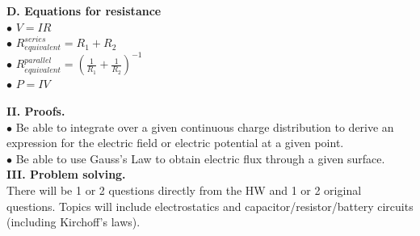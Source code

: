 \documentclass[11pt]{article}
\begin{document}
\begin{addmargin}[1em]{0em}
\textbf{D. Equations for resistance} \\
$\bullet$ $V = IR$ \\
$\bullet$ $R_{equivalent}^{series} = R_1 + R_2$ \\
$\bullet$ $R_{equivalent}^{parallel} = \left( \frac{1}{R_1} + \frac{1}{R_2} \right)^{-1}$ \\
$\bullet$ $P = IV$ \\

\end{addmargin}

\vspace{\baselineskip}
\textbf{II. Proofs.} \\
$\bullet$ Be able to integrate over a given continuous charge distribution to derive an expression for the electric field or electric potential at a given point. \\
$\bullet$ Be able to use Gauss's Law to obtain electric flux through a given surface. \\

\vspace{\baselineskip}
\textbf{III. Problem solving.} \\
There will be 1 or 2 questions directly from the HW and 1 or 2 original questions.
Topics will include electrostatics and capacitor/resistor/battery circuits (including Kirchoff's laws).
\end{document}
